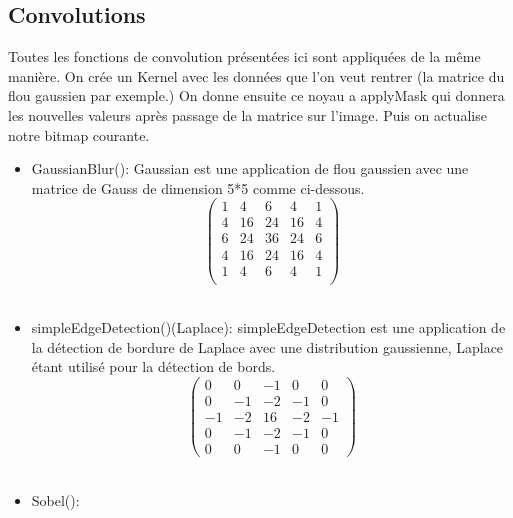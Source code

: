 \documentclass[12pt]{article}
\begin{document}
\begin{itemize}
    \subsection{Convolutions}
        Toutes les fonctions de convolution présentées ici sont appliquées de la même manière.
        On crée un Kernel avec les données que l'on veut rentrer (la matrice du flou gaussien par exemple.)
        On donne ensuite ce noyau a applyMask qui donnera les nouvelles valeurs après passage de la matrice sur l'image.
        Puis on actualise notre bitmap courante.

    \begin{itemize}
        
        \item GaussianBlur():
        Gaussian est une application de flou gaussien avec une matrice de Gauss de dimension 5*5 comme ci-dessous.
            \begin{equation}
                \begin{pmatrix}
                    1 & 4 & 6 & 4& 1\\
                    4 & 16 & 24 & 16 & 4\\
                    6 & 24 & 36 & 24 & 6\\
                    4 & 16 & 24 & 16 & 4\\
                    1 & 4 & 6 & 4 & 1\\
                \end{pmatrix}
            \end{equation} 
        \\
        \item simpleEdgeDetection()(Laplace): 
        simpleEdgeDetection est une application de la détection de bordure de Laplace avec une distribution gaussienne, Laplace étant utilisé pour la détection de bords.
        \begin{equation}
            \begin{pmatrix}
                0 &  0 & -1 &  0 &  0\\
                0 & -1 & -2 & -1 &  0\\
                -1 & -2 & 16 & -2 & -1\\
                0 & -1 & -2 & -1 &  0\\
                0 &  0 & -1 &  0 &  0
            \end{pmatrix}
        \end{equation} 
        \\
        \item Sobel():

\end{itemize}
\end{itemize}
\end{document}
